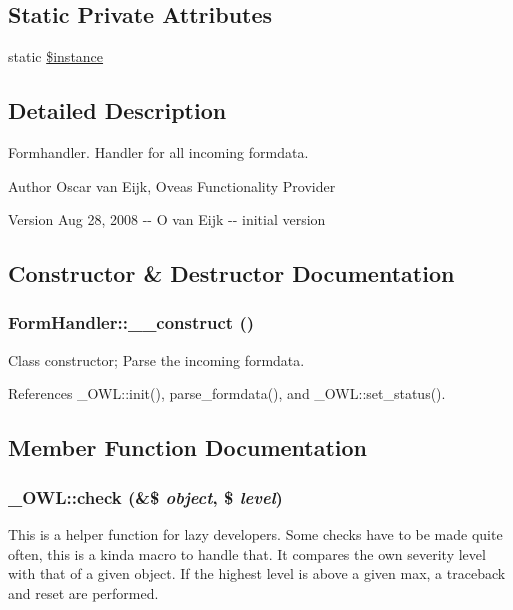 \subsection*{Static Private Attributes}
\begin{DoxyCompactItemize}
\item 
static \hyperlink{classFormHandler_a54efe3849e4065053f0eb0313356d072}{\$instance}
\end{DoxyCompactItemize}


\subsection{Detailed Description}
Formhandler. Handler for all incoming formdata. \begin{DoxyAuthor}{Author}
Oscar van Eijk, Oveas Functionality Provider 
\end{DoxyAuthor}
\begin{DoxyVersion}{Version}
Aug 28, 2008 -\/-\/ O van Eijk -\/-\/ initial version 
\end{DoxyVersion}


\subsection{Constructor \& Destructor Documentation}
\subsubsection[{\_\-\_\-construct}]{\setlength{\rightskip}{0pt plus 5cm}FormHandler::\_\-\_\-construct ()}\label{classFormHandler_a1ef7ad4fe143dd8339c8ab66423a1934}
Class constructor; Parse the incoming formdata. 

References \_\-OWL::init(), parse\_\-formdata(), and \_\-OWL::set\_\-status().



\subsection{Member Function Documentation}
\subsubsection[{check}]{\setlength{\rightskip}{0pt plus 5cm}\_\-OWL::check (\&\$ {\em object}, \/  \$ {\em level})}\label{class__OWL_ad6f4f6946f40199dd0333cf219fa500e}
This is a helper function for lazy developers. Some checks have to be made quite often, this is a kinda macro to handle that. It compares the own severity level with that of a given object. If the highest level is above a given max, a traceback and reset are performed.


